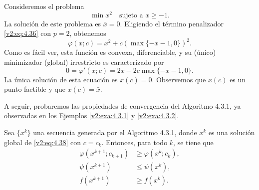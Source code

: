 \begin{example}\label{v2:exa:4.3.2}
    Consideremos el problema
    \[
        \min x^2 \quad \text{sujeto a } x \ge -1.
    \]
    La solución de este problema es $\bar{x} = 0$.
    Eligiendo el término penalizador \eqref{v2:eq:4.36} con $p = 2$, obtenemos
    \[
        \varphi(x; c) = x^2 + c(\max\{-x - 1, 0\})^2.
    \]
    Como es fácil ver, esta función es convexa, diferenciable, y su (único) minimizador (global) irrestricto es caracterizado por
    \[
        0 = \varphi'(x; c) = 2x - 2c\max\{-x - 1, 0\}.
    \]
    La única solución de esta ecuación es $x(c) = 0$.
    Observemos que $x(c)$ es un punto factible y que $x(c) = \bar{x}$.
\end{example}

A seguir, probaremos las propiedades de convergencia del Algoritmo 4.3.1, ya observadas en los Ejemplos \ref{v2:exa:4.3.1} y \ref{v2:exa:4.3.2}.

\begin{proposition}\label{v2:prop:4.3.1}
    Sea $\{x^k\}$ una secuencia generada por el Algoritmo 4.3.1, donde $x^k$ es una solución global de \eqref{v2:eq:4.38} con $c = c_k$. Entonces, para todo $k$, se tiene que
    \begin{align}
        \varphi(x^{k+1}; c_{k+1}) &\ge \varphi(x^k; c_k), \label{v2:eq:4.40} \\
        \psi(x^{k+1}) &\le \psi(x^k), \label{v2:eq:4.41} \\
        f(x^{k+1}) &\ge f(x^k). \label{v2:eq:4.42}
    \end{align}
\end{proposition}

